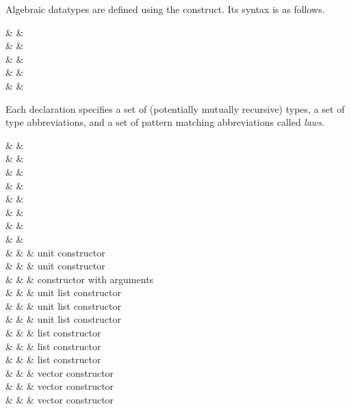  \label{sec:algebraic-datatypes}
   Algebraic datatypes are defined using the 
construct.  Its syntax is as follows.

\begin{syntax}
   & \IS &  \\
   &     & \quad {} \\
   &     & \quad {} \\
   &     & \quad {} \\
   &     & \T{;} \\
\end{syntax}

Each  declaration specifies a set of 
(potentially mutually recursive) types, a set of type abbreviations,
and a set of pattern matching abbreviations called {\em laws}.

\begin{syntax}
   & \IS & \Id {} \\
   &     & \quad {} \\
   &     & \quad {} \\
   &     & \quad {} \\
   & \IS &  \\
   &     & \quad {} \\
   & \IS &   \\
   &     &  \quad {} \\
   & \IS & \Id {} & unit constructor \\
   & \OR &               & unit constructor \\
   & \OR & \Id {} \TypeExp  & constructor with arguments \\
   & \OR & \T{\#[} \T{]}                 & unit list constructor \\
   & \OR & \T{\#\{} \T{\}}               & unit list constructor \\
   & \OR & \T{\#(} \T{)}                 & unit list constructor \\
   & \OR & \T{\#[} \TypeExp {} \TypeExp \T{]}   
      & list constructor \\
   & \OR & \T{\#\{} \TypeExp {} \TypeExp \T{\}} 
      & list constructor \\
   & \OR & \T{\#(} \TypeExp {} \TypeExp \T{)}   
      & list constructor \\
   & \OR & \T{[|} \TypeExp \T{|]} & vector constructor \\
   & \OR & \T{(|} \TypeExp \T{|)} & vector constructor \\
   & \OR & \T{\{|} \TypeExp \T{|\}} & vector constructor \\
\end{syntax} 


